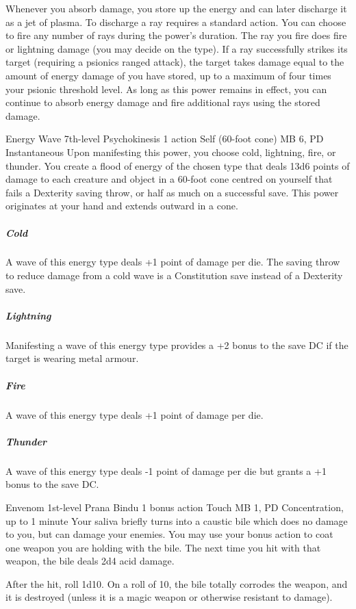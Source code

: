   Whenever you absorb damage,
  you store up the energy and can later discharge it
  as a jet of plasma.
  To discharge a ray requires a standard action.
  You can choose to fire any number of rays
  during the power's duration.
  The ray you fire does fire or lightning damage
  (you may decide on the type).
  If a ray successfully strikes its target
  (requiring a psionics ranged attack),
  the target takes damage equal to the amount of energy damage
  of you have stored,
  up to a maximum of four times your psionic threshold level.
  As long as this power remains in effect,
  you can continue to absorb energy damage and
  fire additional rays using the stored damage.

\DndPowerHeader%
  {Energy Wave}
  {7th-level Psychokinesis}
  {1 action}
  {Self (60-foot cone)}
  {MB 6, PD \lvlseven}
  {Instantaneous}
  Upon manifesting this power,
  you choose cold, lightning, fire, or thunder.
  You create a flood of energy of the chosen type
  that deals 13d6 points of damage
  to each creature and object in a 60-foot cone
  centred on yourself
  that fails a Dexterity saving throw,
  or half as much on a successful save.
  This power originates at your hand
  and extends outward in a cone.
  \subparagraph{Cold}
    A wave of this energy type deals +1 point
    of damage per die.
    The saving throw to reduce damage from a cold wave
    is a Constitution save instead of a Dexterity save.  
  \subparagraph{Lightning}
    Manifesting a wave of this energy type
    provides a +2 bonus to the save DC if the target is wearing
    metal armour.
  \subparagraph{Fire}
    A wave of this energy type deals +1 point of damage per die.
  \subparagraph{Thunder}
    A wave of this energy type deals -1 point of damage per die
    but grants a +1 bonus to the save DC.

\DndPowerHeader%
  {Envenom}
  {1st-level Prana Bindu}
  {1 bonus action}
  {Touch}
  {MB 1, PD \lvlone}
  {Concentration, up to 1 minute}
Your saliva briefly turns into a caustic bile
which does no damage to you,
but can damage your enemies.
You may use your bonus action to coat one weapon
you are holding with the bile.
The next time you hit with that weapon,
the bile deals 2d4 acid damage.

After the hit, roll 1d10.
On a roll of 10,
the bile totally corrodes the weapon,
and it is destroyed
(unless it is a magic weapon or otherwise resistant
to damage).

